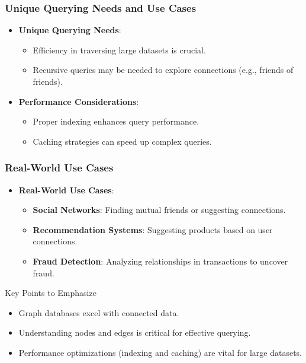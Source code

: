 \documentclass[aspectratio=169]{beamer}
\begin{document}
\begin{frame}[fragile]
    \frametitle{Unique Querying Needs and Use Cases}
    \begin{itemize}
        \item \textbf{Unique Querying Needs}:
        \begin{itemize}
            \item Efficiency in traversing large datasets is crucial.
            \item Recursive queries may be needed to explore connections (e.g., friends of friends).
        \end{itemize}
        \item \textbf{Performance Considerations}:
        \begin{itemize}
            \item Proper indexing enhances query performance.
            \item Caching strategies can speed up complex queries.
        \end{itemize}
    \end{itemize}
\end{frame}

\begin{frame}[fragile]
    \frametitle{Real-World Use Cases}
    \begin{itemize}
        \item \textbf{Real-World Use Cases}:
        \begin{itemize}
            \item \textbf{Social Networks}: Finding mutual friends or suggesting connections.
            \item \textbf{Recommendation Systems}: Suggesting products based on user connections.
            \item \textbf{Fraud Detection}: Analyzing relationships in transactions to uncover fraud.
        \end{itemize}
    \end{itemize}
    \begin{block}{Key Points to Emphasize}
        \begin{itemize}
            \item Graph databases excel with connected data.
            \item Understanding nodes and edges is critical for effective querying.
            \item Performance optimizations (indexing and caching) are vital for large datasets.
        \end{itemize}
    \end{block}
\end{frame}
\end{document}
